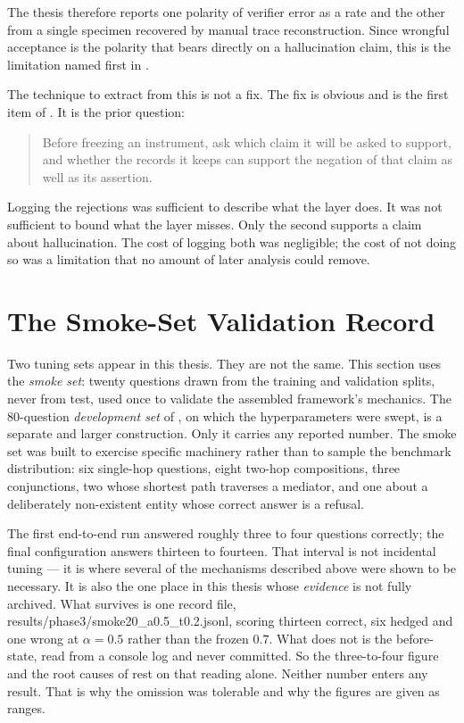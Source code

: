 The thesis therefore reports one polarity of verifier error as a rate and the
other from a single specimen recovered by manual trace reconstruction. Since
wrongful acceptance is the polarity that bears directly on a hallucination
claim, this is the limitation named first in .

The technique to extract from this is not a fix. The fix is obvious and is the
first item of . It is the prior question:

\begin{quote}
Before freezing an instrument, ask which claim it will be asked to support, and
whether the records it keeps can support the negation of that claim as well as
its assertion.
\end{quote}

Logging the rejections was sufficient to describe what the layer does. It was
not sufficient to bound what the layer misses. Only the second supports a
claim about hallucination. The cost of logging both was negligible; the cost of
not doing so was a limitation that no amount of later analysis could remove.


\section{The Smoke-Set Validation Record}\label{app:smoke}

Two tuning sets appear in this thesis. They are not the same. This section
uses the \emph{smoke set}: twenty questions drawn from the training and
validation splits, never from test, used once to validate the assembled
framework's mechanics. The $80$-question \emph{development set} of
, on which the hyperparameters were swept, is a
separate and larger construction. Only it carries any reported number. The
smoke set was built to exercise specific machinery rather than to sample the
benchmark distribution: six single-hop questions, eight two-hop compositions,
three conjunctions, two whose shortest path traverses a mediator, and one about
a deliberately non-existent entity whose correct answer is a refusal.

The first end-to-end run answered roughly three to four questions correctly; the
final configuration answers thirteen to fourteen. That interval is not
incidental tuning --- it is where several of the mechanisms described above were
shown to be necessary. It is also the one place in this thesis whose
\emph{evidence} is not fully archived. What survives is one record file,
\textsf{results/phase3/smoke20\_a0.5\_t0.2.jsonl}, scoring thirteen correct, six
hedged and one wrong at $\alpha = 0.5$ rather than the frozen $0.7$. What does
not is the before-state, read from a console log and never committed. So the
three-to-four figure and the root causes of  rest on that
reading alone. Neither number enters any result. That is why the omission was
tolerable and why the figures are given as ranges.

